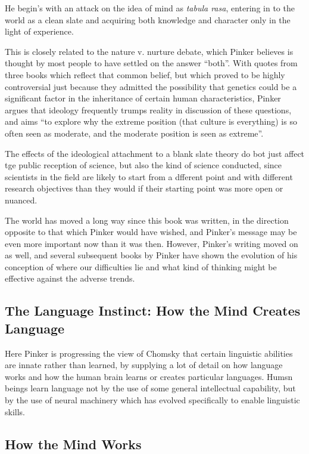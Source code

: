 \documentclass[10pt,titlepage]{book}
\begin{document}
He begin's with an attack on the idea of mind as \emph{tabula rasa}, entering in to the world as a clean slate and acquiring both knowledge and character only in the light of experience.

This is closely related to the nature v. nurture debate, which Pinker believes is thought by most people to have settled on the answer ``both''.
With quotes from three books which reflect that common belief, but which proved to be highly controversial just because they admitted the possibility that genetics could be a significant factor in the inheritance of certain human characteristics, Pinker argues that ideology frequently trumps reality in discussion of these questions, and aims ``to explore why the extreme position (that culture is everything) is so often seen as moderate, and the moderate position is seen as extreme''.

The effects of the ideological attachment to a blank slate theory do bot just affect tge public reception of science, but also the kind of science conducted, since scientists in the field are likely to start from a dfferent point and with different research objectives than they would if their starting point was more open or nuanced.

The world has moved a long way since this book was written, in the direction opposite to that which Pinker would have wished, and Pinker's message may be even more important now than it was then.
However, Pinker's writing moved on as well, and several subsequent books by Pinker have shown the evolution of his conception of where our difficulties lie and what kind of thinking might be effective against the adverse trends.

\subsection{The Language Instinct: How the Mind Creates Language\cite{pinker-tli}}

Here Pinker is progressing the view of Chomsky that certain linguistic abilities are innate rather than learned, by supplying a lot of detail on how language works and how the human brain learns or creates particular languages.
Humsn beings learn language not by the use of some general intellectual capability, but by the use of neural machinery which has evolved specifically to enable linguistic skills.

\subsection{How the Mind Works \cite{pinker-tbs}}
\end{document}
